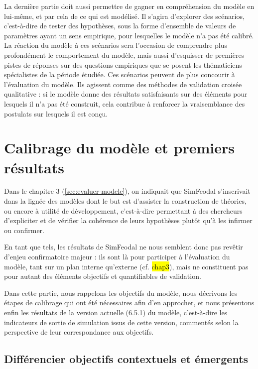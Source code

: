 La dernière partie doit aussi permettre de gagner en compréhension du modèle en lui-même, et par cela de ce qui est modélisé.
Il s'agira d'explorer des \og scénarios\fg{}, c'est-à-dire de tester des hypothèses, sous la forme d'ensemble de valeurs de paramètres ayant un sens empirique, pour lesquelles le modèle n'a pas été calibré.
La réaction du modèle à ces scénarios sera l'occasion de comprendre plus profondément le comportement du modèle, mais aussi d'esquisser de premières pistes de réponses sur des questions empiriques que se posent les thématiciens spécialistes de la période étudiée.
Ces scénarios peuvent de plus concourir à l'évaluation du modèle.
Ils agissent comme des méthodes de \og validation croisée\fg{} qualitative : si le modèle donne des résultats satisfaisants sur des éléments pour lesquels il n'a pas été construit, cela contribue à renforcer la vraisemblance des postulats sur lesquels il est conçu.

\section{Calibrage du modèle et premiers résultats}

Dans le chapitre 3 (\cref{sec:evaluer-modele}), on indiquait que SimFeodal s'inscrivait dans la lignée des  modèles dont le but est d'\og assister la construction de théories\fg{}, ou encore \og à utilité de développement\fg{}, c'est-à-dire permettant à des chercheurs d'expliciter et de vérifier la cohérence de leurs hypothèses plutôt qu'à les infirmer ou confirmer.

En tant que tels, les \og résultats\fg{} de SimFeodal ne nous semblent donc pas revêtir d'enjeu confirmatoire majeur : ils sont là pour participer à l'évaluation du modèle, tant sur un plan interne qu'externe (cf. \hl{chap3}), mais ne constituent pas pour autant des éléments objectifs et quantifiables de validation.

Dans cette partie, nous rappelons les objectifs du modèle, nous décrivons les étapes de calibrage qui ont été nécessaires afin d'en approcher, et nous présentons enfin les résultats de la version actuelle (6.5.1) du modèle, c'est-à-dire les indicateurs de sortie de simulation issus de cette version, commentés selon la perspective de leur correspondance aux objectifs.

\subsection{Différencier objectifs contextuels et émergents}

